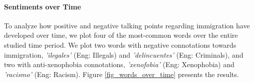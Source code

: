         
        
            
            
          
        
        
    \paragraph{Sentiments over Time}    
        
       To analyze how positive and negative talking points regarding immigration have developed over time, we plot four of the most-common words over the entire studied time period. We plot two words with negative connotations towards immigration, {\it 'ilegales'} (Eng: Illegals) and {\it 'delincuentes'} (Eng: Criminals), and two with anti-xenophobia connotations, {\it 'xenofobia'} (Eng: Xenophobia) and {\it 'racismo'} (Eng: Racism). Figure \ref{fig_words_over_time} presents the results.
       
